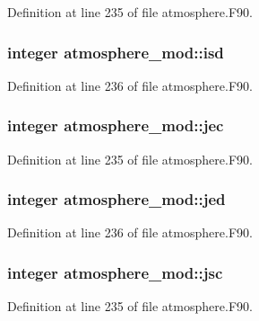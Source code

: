 Definition at line 235 of file atmosphere.\-F90.

\subsubsection[{isd}]{\setlength{\rightskip}{0pt plus 5cm}integer atmosphere\-\_\-mod\-::isd\hspace{0.3cm}{\ttfamily [private]}}\label{classatmosphere__mod_a26b6f2e397bc0d76f12ae674aad670be}


Definition at line 236 of file atmosphere.\-F90.

\subsubsection[{jec}]{\setlength{\rightskip}{0pt plus 5cm}integer atmosphere\-\_\-mod\-::jec\hspace{0.3cm}{\ttfamily [private]}}\label{classatmosphere__mod_a0ac3bd99046244dd0abfa4719b688bc0}


Definition at line 235 of file atmosphere.\-F90.

\subsubsection[{jed}]{\setlength{\rightskip}{0pt plus 5cm}integer atmosphere\-\_\-mod\-::jed\hspace{0.3cm}{\ttfamily [private]}}\label{classatmosphere__mod_a0d51bfe05ec1bd062c1fbbc01c42bf3a}


Definition at line 236 of file atmosphere.\-F90.

\subsubsection[{jsc}]{\setlength{\rightskip}{0pt plus 5cm}integer atmosphere\-\_\-mod\-::jsc\hspace{0.3cm}{\ttfamily [private]}}\label{classatmosphere__mod_aa39dea540d1cba46aa0cd710e17bf8a9}


Definition at line 235 of file atmosphere.\-F90.

